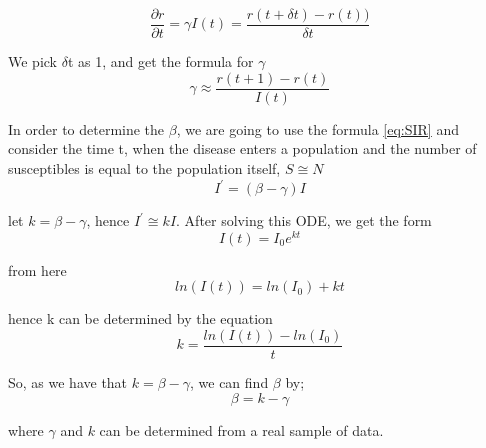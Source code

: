 \begin{equation}
	 \frac{\partial r}{\partial t} = \gamma I(t) = \frac{r(t+\delta t)-r(t))}{\delta t}\label{eq:4.2.4}
\end{equation}
\par We pick $\delta$t as 1, and get the formula for $\gamma$
\begin{equation}
	 \gamma \approx \frac{r(t+1)-r(t)}{I(t)}
\end{equation}
\par In order to determine the $\beta$, we are going to use the formula \ref{eq:SIR} and consider the
time t, when the disease enters a population and the number of susceptibles is equal to the population itself, $S\cong N$
\begin{equation}
	I^{\prime} = (\beta - \gamma) I 
\end{equation}
\par let $k=\beta-\gamma$, hence $I^{\prime} \cong kI$. After solving this ODE, we get the form
\begin{equation}
	I(t)=I_{0}e^{kt}
\end{equation}
\par from here
\begin{equation}
	ln(I(t))=ln(I_{0}) + kt
\end{equation}
\par hence k can be determined by the equation
\begin{equation}
	k = \frac{ln(I(t))-ln(I_{0})}{t}
\end{equation}
\par So, as we have that $k=\beta-\gamma$, we can find $\beta$ by;
\begin{equation}
	\beta = k - \gamma
\end{equation}
\par where $\gamma$ and $k$ can be determined from a real sample of data. \cite{Math_Hands-On_with_Python}